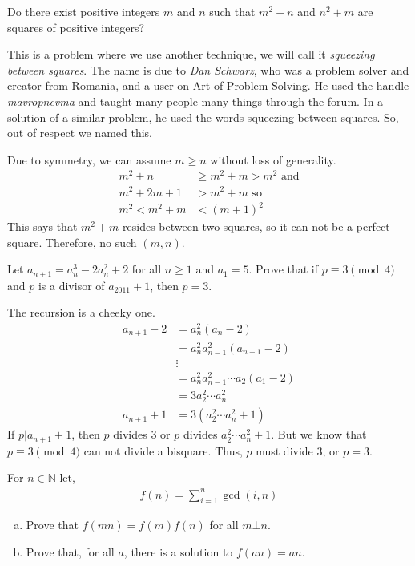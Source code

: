 \documentclass[problems.tex]{subfile}
\begin{document}
	\begin{problem}[Croatia $2014$]
		Do there exist positive integers $m$ and $n$ such that $m^2+n$ and $n^2+m$ are squares of positive integers?
	\end{problem}
	
This is a problem where we use another technique, we will call it \textit{squeezing between squares}. The name is due to \textit{Dan Schwarz}, who was a problem solver and creator from Romania, and a user on Art of Problem Solving. He used the handle \textit{mavropnevma} and taught many people many things through the forum. In a solution of a similar problem, he used the words squeezing between squares. So, out of respect we named this.
	\begin{solution}
		Due to symmetry, we can assume $m\geq n$ without loss of generality.
			\begin{align*}
				m^2+n & \geq m^2+m>m^2\text { and}\\
				m^2+2m+1 &> m^2+m\text { so}\\
				m^2 < m^2+m&<(m+1)^2
			\end{align*}
		This says that $m^2+m$ resides between two squares, so it can not be a perfect square. Therefore, no such $(m,n)$.
	\end{solution}
	
	\begin{problem}[Turkey $2011$]
		Let $a_{n+1}=a_n^3-2a_n^2+2$ for all $n\geq1$ and $a_1=5$. Prove that if $p\equiv3\pmod4$ and $p$ is a divisor of $a_{2011}+1$, then $p=3$.
	\end{problem}
	
	\begin{solution}
		The recursion is a cheeky one.	
			\begin{align*}
				a_{n+1}-2 & = a_n^2(a_n-2)\\
						  & = a_n^2a_{n-1}^2(a_{n-1}-2)\\
						  & \vdots\\
						  & = a_n^2a_{n-1}^2\cdots a_2(a_1-2)\\
						  & = 3a_2^2\cdots a_n^2\\
				a_{n+1}+1 & = 3(a_2^2\cdots a_n^2+1)
			\end{align*}
		If $p|a_{n+1}+1$, then $p$ divides $3$ or $p$ divides $a_2^2\cdots a_n^2+1$. But we know that $p\equiv3\pmod4$ can not divide a bisquare. Thus, $p$ must divide $3$, or $p=3$.
	\end{solution}
	
	\begin{problem}
		For $n\in\mathbb{N} $ let,
			\begin{align*}
				f(n)=\sum\limits_{i=1}^n\gcd(i,n)
			\end{align*}
			
			\begin{enumerate}[(a)]
				\item Prove that $f(mn)=f(m)f(n)$ for all $m\bot n$.
				\item Prove that, for all $a$, there is a solution to $f(an)=an$.
			\end{enumerate}
	\end{problem}
	
\end{document}
